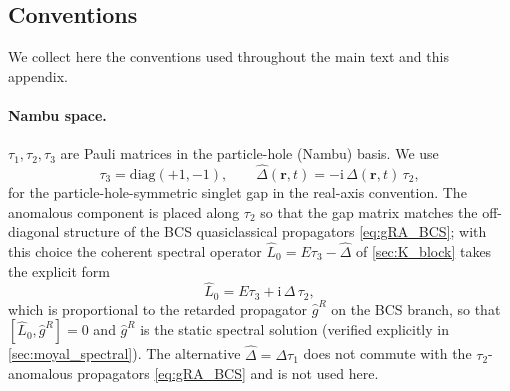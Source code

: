\documentclass[
  aps,
  prb,
  preprint,
  superscriptaddress,
  longbibliography,
  nofootinbib
]{revtex4-2}
\newcommand{\ii}{\mathrm{i}}
\newcommand{\br}{\mathbf{r}}
\newcommand{\hatg}{\hat{g}}
\newcommand{\hatD}{\hat{\Delta}}
\begin{document}
\subsection{Conventions}
\label{sec:conventions}

We collect here the conventions used throughout the main text and this
appendix.

\paragraph{Nambu space.} \(\tau_1, \tau_2, \tau_3\) are Pauli matrices in the
particle-hole (Nambu) basis. We use
\[
  \tau_3=\mathrm{diag}(+1,-1),
  \qquad
  \hatD(\br,t)=-\ii\,\Delta(\br,t)\,\tau_2 ,
\]
for the particle-hole-symmetric singlet gap in the real-axis convention. The
anomalous component is placed along \(\tau_2\) so that the gap matrix matches
the off-diagonal structure of the BCS quasiclassical propagators
\cref{eq:gRA_BCS}; with this choice the coherent spectral operator
\(\hat L_0=E\tau_3-\hatD\) of \cref{sec:K_block} takes the explicit form
\[
  \hat L_0=E\tau_3+\ii\,\Delta\,\tau_2 ,
\]
which is proportional to the retarded propagator \(\hatg^{R}\) on the BCS
branch, so that \([\hat L_0,\hatg^{R}]=0\) and \(\hatg^{R}\) is the static
spectral solution (verified explicitly in \cref{sec:moyal_spectral}). The
alternative \(\hatD=\Delta\tau_1\) does not commute with the
\(\tau_2\)-anomalous propagators \cref{eq:gRA_BCS} and is not used here.
\end{document}
